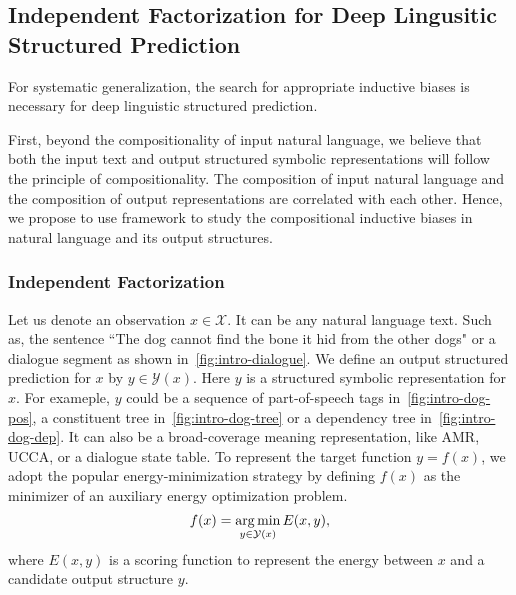 %

\subsection{Independent Factorization for Deep Lingusitic Structured
  Prediction}
\label{ssec:intro:bias-dsp}

For systematic generalization, the search for appropriate inductive
biases is necessary for deep linguistic structured prediction.

First, beyond the compositionality of input natural language, we
believe that both the input text and output structured symbolic
representations will follow the principle of compositionality. The
composition of input natural language and the composition of output
representations are correlated with each other. Hence, we propose to
use  framework to study the
compositional inductive biases in natural language and its output
structures.

\subsubsection{Independent Factorization}
\label{ssec:intro:ind-factorization}

Let us denote an observation $x \in \mathcal{X}$. It can be any natural
language text. Such as, the sentence ``The dog cannot find the bone it
hid from the other dogs" or a dialogue segment as shown
in~\autoref{fig:intro-dialogue}. We define an output structured
prediction for $x$ by $y \in \mathcal{Y}(x)$. Here $y$ is a structured
symbolic representation for $x$. For exameple, $y$ could be a sequence
of part-of-speech tags in~\autoref{fig:intro-dog-pos}, a constituent
tree in~\autoref{fig:intro-dog-tree} or a dependency tree
in~\autoref{fig:intro-dog-dep}. It can also be a broad-coverage
meaning representation, like AMR, UCCA, or a dialogue state table. To
represent the target function $y=f(x)$, we adopt the popular
energy-minimization strategy by defining $f(x)$ as the minimizer of an
auxiliary energy optimization problem.
\begin{equation}
\label{eq:argmin}
f(x) = \operatorname*{arg\,min}_{y \in \mathcal{Y}(x)} E(x, y),
\end{equation}
where $E(x,y)$ is a scoring function to represent the energy between
$x$ and a candidate output structure $y$.

